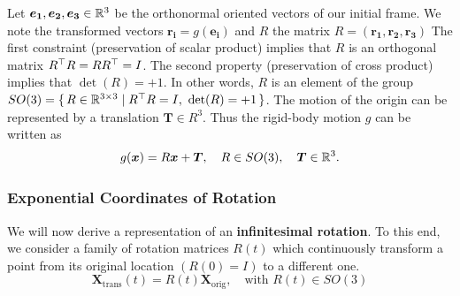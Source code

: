 Let $\bm{e_1}, \bm{e_2}, \bm{e_3} \in \mathbb{R}^3$
be the orthonormal oriented vectors of our initial frame.
We note the transformed vectors $\bm{r_i} = g(\bm{e_i})$
and $R$ the matrix $R = (\bm{r_1}, \bm{r_2}, \bm{r_3})$
The first constraint (preservation of scalar product) implies that
$R$ is an orthogonal matrix $R^{\top}R=RR^{\top}=I$.
The second property (preservation of cross product) implies that $\det(R) = +1$.
In other words, $R$ is an element of the group
$SO(3) = \{\, R \in \mathbb{R}^{3 \times{} 3} \mid{} R^{\top}R=I,\ \det(R) = +1 \,\}$.
The motion of the origin can be represented by a translation $\bm{T} \in R^3$.
Thus the rigid-body motion $g$ can be written as
\[
	g(\bm{x}) = R\bm{x} + \bm{T},\quad R \in SO(3),\quad \bm{T} \in \mathbb{R}^3.
\]




\subsubsection{Exponential Coordinates of Rotation}%
\label{ssub:exponential_coordinates_of_rotation}

We will now derive a representation of an \textbf{infinitesimal rotation}.
To this end, we consider a family of rotation matrices $R(t)$
which continuously transform a point from its original location
$(R(0) = I)$ to a different one.
	\[\bm{X}_{\text{trans}}(t) = R(t)\bm{X}_{\text{orig}}, \quad
	\text{with } R(t) \in SO(3)\]

